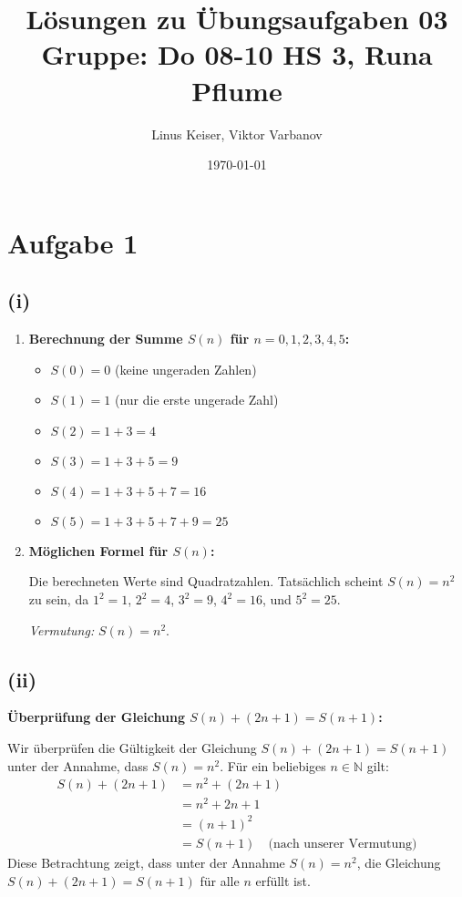 \documentclass{article}
\title{Lösungen zu Übungsaufgaben 03 \\ \small Gruppe: Do 08-10 HS 3, Runa Pflume}
\author{Linus Keiser, Viktor Varbanov}
\date{\today}
\begin{document}
\maketitle

\section*{Aufgabe 1}

\subsection*{(i)}

\begin{enumerate}
	\item \textbf{Berechnung der Summe \( S(n) \) für \( n = 0, 1, 2, 3, 4, 5 \):}
	      \begin{itemize}
		      \item \( S(0) = 0 \) (keine ungeraden Zahlen)
		      \item \( S(1) = 1 \) (nur die erste ungerade Zahl)
		      \item \( S(2) = 1 + 3 = 4 \)
		      \item \( S(3) = 1 + 3 + 5 = 9 \)
		      \item \( S(4) = 1 + 3 + 5 + 7 = 16 \)
		      \item \( S(5) = 1 + 3 + 5 + 7 + 9 = 25 \)
	      \end{itemize}
	\item \textbf{Möglichen Formel für \( S(n) \):}

	      Die berechneten Werte sind Quadratzahlen. Tatsächlich scheint \( S(n) = n^2 \) zu sein, da \( 1^2 = 1 \), \( 2^2 = 4 \), \( 3^2 = 9 \), \( 4^2 = 16 \), und \( 5^2 = 25 \).

	      \textit{Vermutung:} \( S(n) = n^2 \).
\end{enumerate}

\subsection*{(ii)}

\textbf{Überprüfung der Gleichung \( S(n) + (2n + 1) = S(n + 1) \):}

Wir überprüfen die Gültigkeit der Gleichung \( S(n) + (2n + 1) = S(n + 1) \) unter der Annahme, dass \( S(n) = n^2 \).
Für ein beliebiges \( n \in \mathbb{N} \) gilt:
\begin{align*}
	S(n) + (2n + 1) & = n^2 + (2n + 1)                                 \\
	                & = n^2 + 2n + 1                                   \\
	                & = (n + 1)^2                                      \\
	                & = S(n + 1) \quad \text{(nach unserer Vermutung)}
\end{align*}
Diese Betrachtung zeigt, dass unter der Annahme \( S(n) = n^2 \), die Gleichung \( S(n) + (2n + 1) = S(n + 1) \) für alle \( n \) erfüllt ist.
\end{document}
